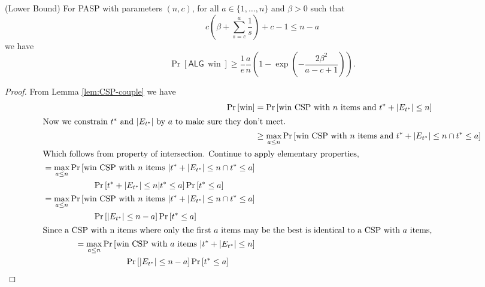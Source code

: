 \begin{theorem}(Lower Bound)
	For PASP with parameters $(n, c)$, for all $a \in \{1, \ldots, n\} $ and $\beta > 0$ such that
	\[
		c\left(\beta+\sum_{s=c}^a \frac{1}{s}\right)+c-1 \leq n-a
	\]
	we have
	\[
		\operatorname{Pr}[\mathsf{ALG}\,\operatorname{win}] \geq  \frac{1}{e} \frac{a}{n}\left(1-\exp \left(-\frac{2 \beta^2}{a-c+1}\right)\right)
	.\] 

	
\end{theorem}
\begin{proof}
	


From Lemma \ref{lem:CSP-couple} we have
\begin{align}
	 \operatorname{Pr}\left[{\text{win}}\right] 
	 &= \operatorname{Pr}\left[{\text{win CSP with }n \text{ items and } t^* +  |E_{t^*}| \le n}\right]\\
	 \intertext{Now we constrain $t^*$ and $|E_{t^*}|$ by  $a$ to make sure they don't meet.}
	   &\ge \max_{a \le n} \operatorname{Pr}\left[{\text{win CSP with }n \text{ items and } t^* +  |E_{t^*}| \le n \cap t^* \le a}\right]\\
	 \intertext{Which follows from property of intersection. Continue to apply elementary properties,}
	 \begin{split}
	   &= \max_{a \le n} \operatorname{Pr}\left[{\text{win CSP with }n \text{ items } |  t^* +  |E_{t^*}| \le n \cap t^* \le a}\right] \\
	   & \qquad\qquad\qquad \operatorname{Pr}\left[{t^* +  |E_{t^*}| \le n | t^* \le a}\right]\operatorname{Pr}\left[{t^* \le a}\right]
	 \end{split}\\
	 \begin{split}
	   &= \max_{a \le n} \operatorname{Pr}\left[{\text{win CSP with }n \text{ items } |  t^* +  |E_{t^*}| \le n \cap t^* \le a}\right] \\
	   &\qquad\qquad\qquad \operatorname{Pr}\left[{|E_{t^*}|\le n-a}\right] \operatorname{Pr}\left[{t^* \le a}\right]
	 \end{split}\\
	 \intertext{Since a CSP with n items where only the first $a$ items may be the best is identical to a CSP with $a$ items,}
	 \begin{split}
	   &= \max_{a \le n} \operatorname{Pr}\left[{\text{win CSP with }a \text{ items } |  t^* +  |E_{t^*}| \le n}\right] \\
	   &\qquad\qquad\qquad \operatorname{Pr}\left[{|E_{t^*}|\le n-a}\right] \operatorname{Pr}\left[{t^* \le a}\right]

\end{split}
\end{align}
\end{proof}

